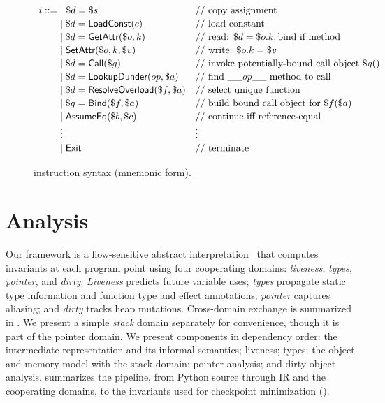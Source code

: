 
\begin{figure}[t]
\centering
\[
\renewcommand{\arraystretch}{1.15}
\begin{array}{l@{}ll}
i ::= \;&\hspace{6pt} \$d = \$s & \text{// copy assignment} \\
      &\mid \$d = \tLoadConst(c) & \text{// load constant} \\
      &\mid \$d = \tGetAttr(\$o, k) & \text{// read: } \$d = \$o.k; \text{bind if method} \\
      &\mid \tSetAttr(\$o, k, \$v) & \text{// write: } \$o.k = \$v \\
      &\mid \$d = \mathsf{Call}(\$g) & \text{// invoke potentially-bound call object } \$g() \\
      &\mid \$d = \tLookupDunder(op, \$a)  & \text{// find \_\_\textit{op}\_\_ method to call} \\
      &\mid \$d = \tResolveOverload(\$f, \$a) & \text{// select unique function} \\
      &\mid \$g = \tBind(\$f, \$a) & \text{// build bound call object for } \$f(\$a) \\
      &\mid \tAssumeEq(\$b, \$c) & \text{// continue iff reference-equal} \\
      & \vdots & \vdots \\
      &\mid \tExit & \text{// terminate}
\end{array}
\]
\caption{\spytecode instruction syntax (mnemonic form).}
\label{fig:tac-syntax-reduced}
\end{figure}

\section{Analysis}
\label{sec:analysis}

Our framework is a flow-sensitive abstract interpretation~\cite{cousot1977abstract} that computes invariants at each program point using four cooperating domains: \emph{liveness}, \emph{types}, \emph{pointer}, and \emph{dirty}. 
\emph{Liveness} predicts future variable uses; \emph{types} propagate static type information and function type and effect annotations; \emph{pointer} captures aliasing; and \emph{dirty} tracks heap mutations. Cross-domain exchange is summarized in . We present a simple \emph{stack} domain separately for convenience, though it is part of the pointer domain.
We present components in dependency order: the intermediate representation and its informal semantics; liveness; types; the object and memory model with the stack domain; pointer analysis; and dirty object analysis.  summarizes the pipeline, from Python source through IR and the cooperating domains, to the invariants used for checkpoint minimization ().

